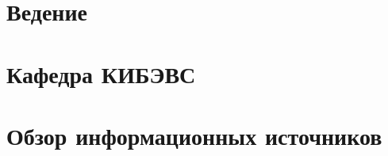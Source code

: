 


 
 
 
 
 \newpage
 \tableofcontents

% 


\titleformat{\section}{\centering\normalfont\normalsize}{\thesection}{1.0em}{}
\titleformat{\subsection}{\centering\normalfont\normalsize}{\thesubsection}{1.0em}{}
\titleformat{\subsubsection}{\centering\normalfont\normalsize}{\thesubsection}{1.0em}{}


\newpage
\setcounter{section}{0}
\section*{Ведение}


\section{Кафедра КИБЭВС}



\newpage 
\section{Обзор информационных источников }


\newpage
